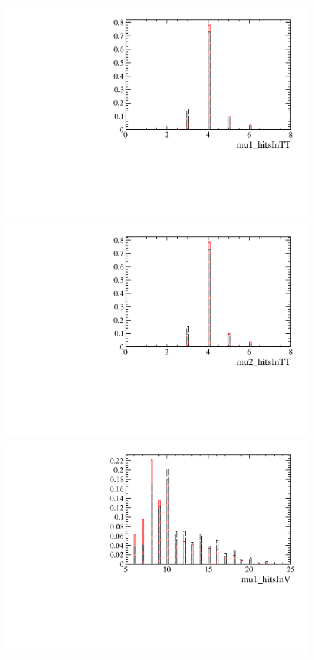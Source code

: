 \begin{figure} [htb!]
\begin{center}
\includegraphics[scale=0.20]{figs/mu1_hitsInTTPARTIAL.pdf}
\includegraphics[scale=0.20]{figs/mu2_hitsInTTPARTIAL.pdf}
\includegraphics[scale=0.20]{figs/mu1_hitsInVPARTIAL.pdf}

\end{center}
\end{figure}
